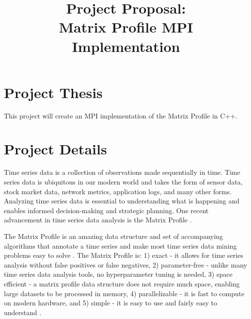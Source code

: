 \documentclass[conference]{IEEEtran}
\begin{document}
\title{Project Proposal:\\Matrix Profile MPI Implementation}

\author{
}


\maketitle


\section{Project Thesis}
This project will create an MPI implementation of the Matrix Profile in C++.

\section{Project Details}
Time series data is a collection of observations made sequentially in time.  Time series data is ubiquitous in our modern world and takes the form of sensor data, stock market data, network metrics, application logs, and many other forms.  Analyzing time series data is essential to understanding what is happening and enables informed decision-making and strategic planning.  One recent advancement in time series data analysis is the Matrix Profile \cite{MatrixProfile1}. 

The Matrix Profile is an amazing data structure and set of accompanying algorithms that annotate a time series and make most time series data mining problems easy to solve \cite{MatrixProfile2}. The Matrix Profile is:  1) exact - it allows for time series analysis without false positives or false negatives, 2) parameter-free - unlike many time series data analysis tools, no hyperparameter tuning is needed, 3) space efficient - a matrix profile data structure does not require much space, enabling large datasets to be processed in memory, 4) parallelizable - it is fast to compute on modern hardware, and 5) simple - it is easy to use and fairly easy to understand \cite{Keogh}.   
\end{document}
